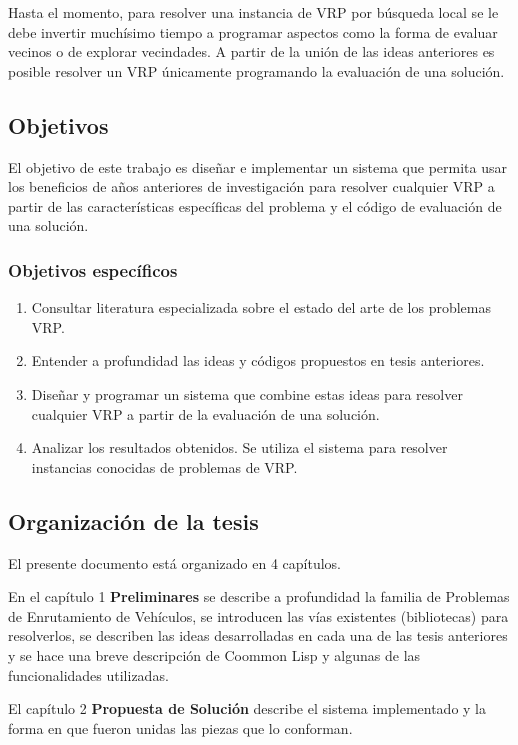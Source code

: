 Hasta el momento, para resolver una instancia de VRP por búsqueda local se le debe invertir muchísimo tiempo a programar aspectos como la forma de evaluar vecinos o de explorar vecindades. A partir de la unión de las ideas anteriores es posible resolver un VRP únicamente programando la evaluación de una solución. 


\subsection*{Objetivos}
El objetivo de este trabajo es diseñar e implementar un sistema que permita usar los beneficios de años anteriores de investigación para resolver cualquier VRP a partir de las características específicas del problema y el código de evaluación de una solución.

\subsubsection*{Objetivos específicos}

\begin{enumerate}
	\item Consultar literatura especializada sobre el estado del arte de los problemas VRP.
	\item Entender a profundidad las ideas y códigos propuestos en tesis anteriores.
	\item Diseñar y programar un sistema que combine estas ideas para resolver cualquier VRP a partir de la evaluación de una solución.	
	\item Analizar los resultados obtenidos. Se utiliza el sistema para resolver instancias conocidas de problemas de VRP.
\end{enumerate}


\subsection*{Organización de la tesis}

El presente documento está organizado en 4 capítulos.


En el capítulo 1 \textbf{Preliminares} se describe a profundidad la familia de Problemas de Enrutamiento de Vehículos, se introducen las vías existentes (bibliotecas) para resolverlos, se describen las ideas desarrolladas en cada una de las tesis anteriores y se hace una breve descripción de Coommon Lisp y algunas de las funcionalidades utilizadas.

El capítulo 2 \textbf{Propuesta de Solución} describe el sistema implementado y la forma en que fueron unidas las piezas que lo conforman.

